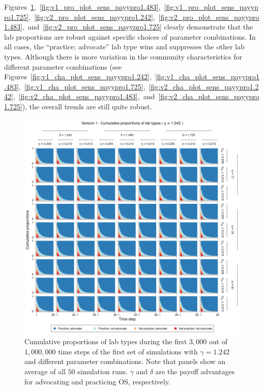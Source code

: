 \documentclass[meta, authordate,issue]{jote-new-article}
\begin{document}
Figures~\ref{fig:v1_pro_plot_sens_payypro1.242},~\ref{fig:v1_pro_plot_sens_payypro1.483},~\ref{fig:v1_pro_plot_sens_payypro1.725},~\ref{fig:v2_pro_plot_sens_payypro1.242},~\ref{fig:v2_pro_plot_sens_payypro1.483},~and~\ref{fig:v2_pro_plot_sens_payypro1.725} clearly demonstrate that the lab proportions are robust against specific choices of parameter combinations. In all cases, the ``practice; advocate'' lab type wins and suppresses the other lab types. Although there is more variation in the community characteristics for different parameter combinations (see Figures~\ref{fig:v1_cha_plot_sens_payypro1.242},~\ref{fig:v1_cha_plot_sens_payypro1.483},~\ref{fig:v1_cha_plot_sens_payypro1.725},~\ref{fig:v2_cha_plot_sens_payypro1.242},~\ref{fig:v2_cha_plot_sens_payypro1.483},~and~\ref{fig:v2_cha_plot_sens_payypro1.725}), the overall trends are still quite robust.
%
\begin{figure}
  \begin{fullwidth}

    \centering
    \includegraphics[width=\textwidth]{v1_pro_plot_sens_payypro1.242.png}
    \caption{Cumulative proportions of lab types during the first $3,000$ out of $1,000,000$ time steps of the first set of simulations with $\gamma=1.242$ and different parameter combinations. Note that panels show an average of all $50$ simulation runs. $\gamma$ and $\delta$ are the payoff advantages for advocating and practicing OS, respectively.}
    \label{fig:v1_pro_plot_sens_payypro1.242}
  \end{fullwidth}
\end{figure}
\end{document}

